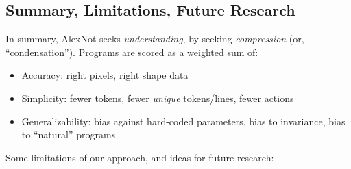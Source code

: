 \documentclass[11pt]{article}
\begin{document}
\subsection{Summary, Limitations, Future Research}

In summary, AlexNot seeks \textit{understanding}, by seeking \textit{compression} (or, ``condensation''). Programs are scored as a weighted sum of:

\begin{itemize}
    \item Accuracy: right pixels, right shape data
    \item Simplicity: fewer tokens, fewer \textit{unique} tokens/lines, fewer actions
    \item Generalizability: bias against hard-coded parameters, bias to invariance, bias to ``natural'' programs
\end{itemize}

Some limitations of our approach, and ideas for future research:
\end{document}
